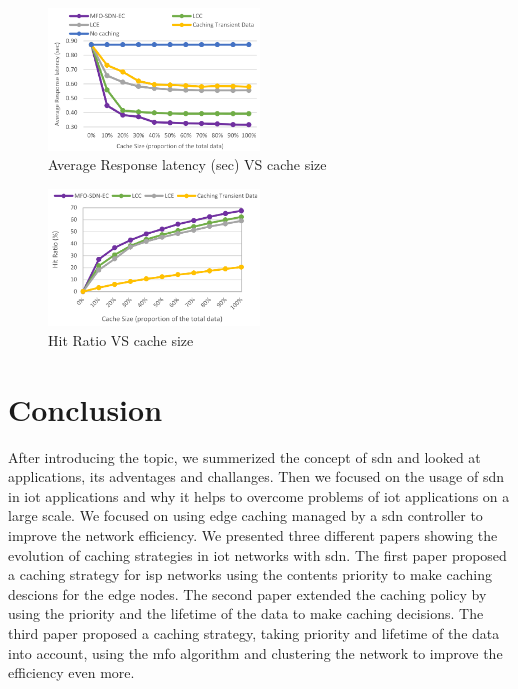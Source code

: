 \documentclass[conference]{IEEEtran}
\begin{document}
	\begin{figure}
		\centering
		\includegraphics[width=0.5\textwidth]{figures/latency-caching.png}
		\caption{Average Response latency (sec) VS cache size \cite{caching-1}}
		\label{fig:latency-caching}
	\end{figure}

	\begin{figure}
		\centering
		\includegraphics[width=0.5\textwidth]{figures/hitrate-caching.png}
		\caption{Hit Ratio VS cache size \cite{caching-1}}
		\label{fig:hitrate-caching}
	\end{figure}

	\section{Conclusion}
	\label{sec:conclusion}

	After introducing the topic, we summerized the concept of \ac{sdn} and looked at applications, its adventages and challanges. Then we focused on the usage of \ac{sdn} in \ac{iot} applications and why it helps to overcome problems of \ac{iot} applications on a large scale. We focused on using edge caching managed by a \ac{sdn} controller to improve the network efficiency. We presented three different papers showing the evolution of caching strategies in \ac{iot} networks with \ac{sdn}. The first paper \cite{caching-7} proposed a caching strategy for \ac{isp} networks using the contents priority to make caching descions for the edge nodes. The second paper \cite{caching-2} extended the caching policy by using the priority and the lifetime of the data to make caching decisions. The third paper \cite{caching-1} proposed a caching strategy, taking priority and lifetime of the data into account, using the \ac{mfo} algorithm and clustering the network to improve the efficiency even more.
\end{document}
